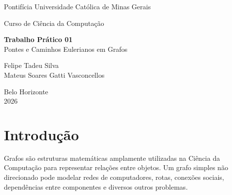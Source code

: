 \documentclass[a4paper,12pt]{article}
\begin{document}
\begin{titlepage}
    \centering

    \vspace*{3cm}

    {\Large Pontifícia Universidade Católica de Minas Gerais\par}
    \vspace{1cm}

    {\Large Curso de Ciência da Computação\par}
    \vspace{3cm}

    {\LARGE \textbf{Trabalho Prático 01}\\
    Pontes e Caminhos Eulerianos em Grafos\par}

    \vspace{3cm}

    {\large Felipe Tadeu Silva\\
    Mateus Soares Gatti Vasconcellos\par}

    \vfill

    {\large Belo Horizonte\\
    2026}

\end{titlepage}

\begin{abstract}
Este relatório apresenta a implementação e a avaliação experimental de algoritmos para identificação de pontes em grafos simples não direcionados e para obtenção de caminhos e circuitos eulerianos. Foram implementadas duas estratégias para detecção de pontes: uma abordagem ingênua, baseada na remoção individual de arestas e verificação de conectividade, e o algoritmo de Tarjan, baseado em busca em profundidade e valores de menor ancestral alcançável. Além disso, foi implementado o algoritmo de Fleury utilizando cada uma dessas estratégias. Os experimentos foram realizados com grafos eulerianos, semi-eulerianos e não eulerianos contendo 100, 1.000, 10.000 e 100.000 vértices. Os resultados mostram que o método de Tarjan apresenta melhor escalabilidade, enquanto o método ingênuo torna-se inviável em grafos maiores.
\end{abstract}

\section{Introdução}

Grafos são estruturas matemáticas amplamente utilizadas na Ciência da Computação para representar relações entre objetos. Um grafo simples não direcionado pode modelar redes de computadores, rotas, conexões sociais, dependências entre componentes e diversos outros problemas.
\end{document}
